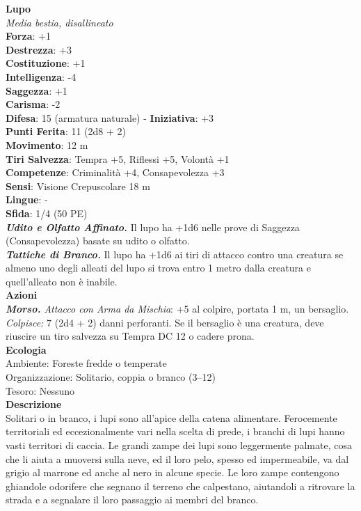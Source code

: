 \begin{multicols}{2}
\medskip\textbf{Lupo}\\
\emph{Media bestia, disallineato}\\
\textbf{Forza}: +1\\
\textbf{Destrezza}: +3\\
\textbf{Costituzione}: +1\\
\textbf{Intelligenza}: -4\\
\textbf{Saggezza}: +1\\
\textbf{Carisma}: -2\\
\textbf{Difesa}: 15 (armatura naturale) - \textbf{Iniziativa}: +3\\
\textbf{Punti Ferita}: 11 (2d8 + 2)\\
\textbf{Movimento}: 12 m\\
\textbf{Tiri Salvezza}: Tempra +5, Riflessi +5, Volontà +1 \\
\textbf{Competenze}: Criminalità +4, Consapevolezza +3\\
\textbf{Sensi}: Visione Crepuscolare 18 m\\
\textbf{Lingue}: -\\
\textbf{Sfida}: 1/4 (50 PE)\smallskip\\
\emph{\textbf{Udito e Olfatto Affinato.}} Il lupo ha +1d6 nelle prove di Saggezza (Consapevolezza) basate su udito o olfatto.\\
\emph{\textbf{Tattiche di Branco.}} Il lupo ha +1d6 ai tiri di attacco contro una creatura se almeno uno degli alleati del lupo si trova entro 1 metro dalla creatura e quell'alleato non è inabile.\\
\smallskip\textbf{Azioni}\\
\emph{\textbf{Morso.} Attacco con Arma da Mischia}: +5 al colpire, portata 1 m, un bersaglio.\\

\emph{Colpisce:} 7 (2d4 + 2) danni perforanti. Se il bersaglio è una creatura, deve riuscire un tiro salvezza su Tempra DC  12 o cadere prona.\\
\textbf{Ecologia}\\
Ambiente: Foreste fredde o temperate\\
Organizzazione: Solitario, coppia o branco (3–12)\\
Tesoro: Nessuno\\
\textbf{Descrizione}\\

Solitari o in branco, i lupi sono all'apice della catena alimentare. Ferocemente territoriali ed eccezionalmente vari nella scelta di prede, i branchi di lupi hanno vasti territori di caccia. Le grandi zampe dei lupi sono leggermente palmate, cosa che li aiuta a muoversi sulla neve, ed il loro pelo, spesso ed impermeabile, va dal grigio al marrone ed anche al nero in alcune specie. Le loro zampe contengono ghiandole odorifere che segnano il terreno che calpestano, aiutandoli a ritrovare la strada e a segnalare il loro passaggio ai membri del branco.\\


\end{multicols}
